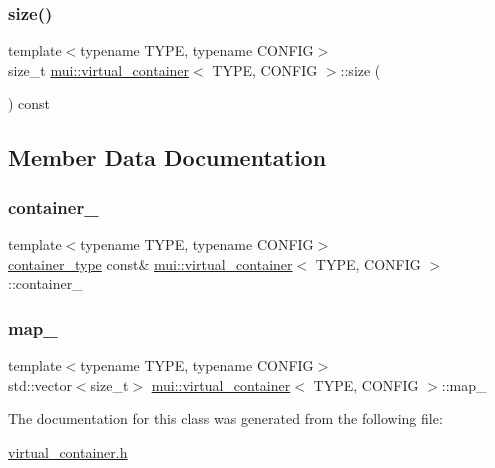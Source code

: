 \subsubsection{\texorpdfstring{size()}{size()}}
{\footnotesize\ttfamily template$<$typename T\+Y\+PE, typename C\+O\+N\+F\+IG$>$ \\
size\+\_\+t \hyperlink{classmui_1_1virtual__container}{mui\+::virtual\+\_\+container}$<$ T\+Y\+PE, C\+O\+N\+F\+IG $>$\+::size (\begin{DoxyParamCaption}{ }\end{DoxyParamCaption}) const\hspace{0.3cm}{\ttfamily [inline]}}



\subsection{Member Data Documentation}
\mbox{\label{classmui_1_1virtual__container_ad1848bae24f0af798fab9ecce71612dc}} 
\subsubsection{\texorpdfstring{container\+\_\+}{container\_}}
{\footnotesize\ttfamily template$<$typename T\+Y\+PE, typename C\+O\+N\+F\+IG$>$ \\
\hyperlink{classmui_1_1virtual__container_a4f84af2177deb7ad3664c6f5935164be}{container\+\_\+type} const\& \hyperlink{classmui_1_1virtual__container}{mui\+::virtual\+\_\+container}$<$ T\+Y\+PE, C\+O\+N\+F\+IG $>$\+::container\+\_\+\hspace{0.3cm}{\ttfamily [protected]}}

\mbox{\label{classmui_1_1virtual__container_af790242e0079d907acb89b12bdf9cd1f}} 
\subsubsection{\texorpdfstring{map\+\_\+}{map\_}}
{\footnotesize\ttfamily template$<$typename T\+Y\+PE, typename C\+O\+N\+F\+IG$>$ \\
std\+::vector$<$size\+\_\+t$>$ \hyperlink{classmui_1_1virtual__container}{mui\+::virtual\+\_\+container}$<$ T\+Y\+PE, C\+O\+N\+F\+IG $>$\+::map\+\_\+\hspace{0.3cm}{\ttfamily [protected]}}



The documentation for this class was generated from the following file\+:\begin{DoxyCompactItemize}
\item 
\hyperlink{virtual__container_8h}{virtual\+\_\+container.\+h}\end{DoxyCompactItemize}
